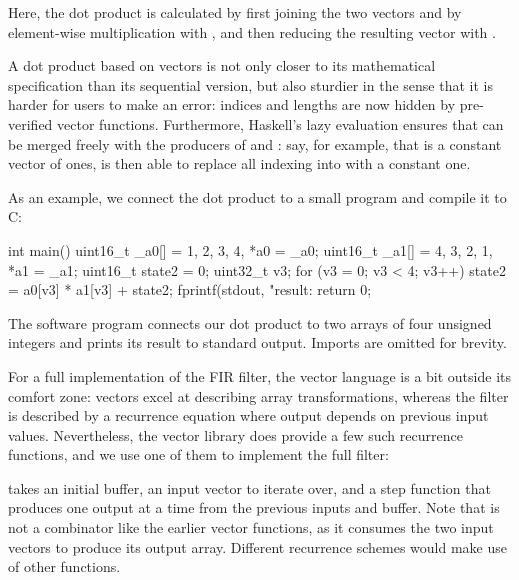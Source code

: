 \documentclass[../paper.tex]{subfiles}
\begin{document}
\noindent Here, the dot product is calculated by first joining the two vectors  and  by element-wise multiplication with , and then reducing the resulting vector with .


A dot product based on vectors is not only closer to its mathematical specification than its sequential version, but also sturdier in the sense that it is harder for users to make an error: indices and lengths are now hidden by pre-verified vector functions. Furthermore, Haskell's lazy evaluation ensures that  can be merged freely with the producers of  and : say, for example, that  is a constant vector of ones,  is then able to replace all indexing into  with a constant one.

As an example, we connect the dot product to a small program and compile it to C:

\begin{code}
int main() {
  uint16_t _a0[] = {1, 2, 3, 4}, *a0 = _a0;
  uint16_t _a1[] = {4, 3, 2, 1}, *a1 = _a1;
  uint16_t state2 = 0;
  uint32_t v3;
  for (v3 = 0; v3 < 4; v3++)
    state2 = a0[v3] * a1[v3] + state2;
  fprintf(stdout, "result: %
  return 0;
}
\end{code}

\noindent The software program connects our dot product to two arrays of four unsigned integers and prints its result to standard output. Imports are omitted for brevity.

For a full implementation of the FIR filter, the vector language is a bit outside its comfort zone: vectors excel at describing array transformations, whereas the filter is described by a recurrence equation where output depends on previous input values. Nevertheless, the vector library does provide a few such recurrence functions, and we use one of them to implement the full filter:


\noindent {} takes an initial buffer, an input vector to iterate over, and a step function that produces one output at a time from the previous inputs and buffer. Note that  is not a combinator like the earlier vector functions, as it consumes the two input vectors to produce its output array. Different recurrence schemes would make use of other functions. 
\end{document}
